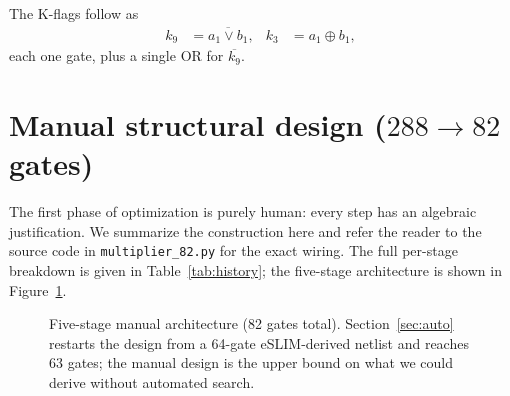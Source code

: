 \documentclass[11pt]{article}
\begin{document}
The K-flags follow as
\begin{align}
  k_9 &= \overline{a_1\vee b_1}, &
  k_3 &= a_1\oplus b_1,
\end{align}
each one gate, plus a single OR for $\overline{k_9}$.

\section{Manual structural design ($288 \to 82$ gates)}
\label{sec:manual}

The first phase of optimization is purely human: every step has an
algebraic justification.
We summarize the construction here and refer the reader to the source
code in \texttt{multiplier\_82.py} for the exact wiring.
The full per-stage breakdown is given in Table~\ref{tab:history}; the
five-stage architecture is shown in Figure~\ref{fig:arch}.

\begin{figure}[h!]
  \centering
  \caption{Five-stage manual architecture (82 gates total).
    Section~\ref{sec:auto} restarts the design from a 64-gate
    eSLIM-derived netlist and reaches 63 gates; the manual design
    is the upper bound on what we could derive without automated
    search.}
  \label{fig:arch}
\end{figure}
\end{document}
